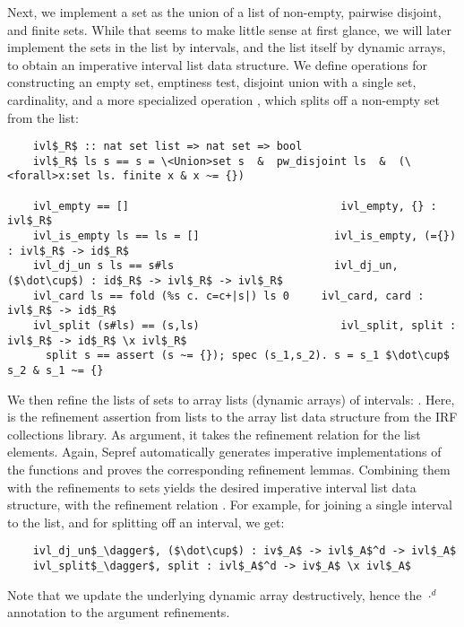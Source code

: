\documentclass[sn-mathphys,Numbered]{sn-jnl}
\theoremstyle{thmstyleone}%
\theoremstyle{definition}%
\theoremstyle{thmstylethree}%
\begin{document}
  Next, we implement a set as the union of a list of non-empty, pairwise disjoint, and finite sets.
  While that seems to make little sense at first glance, we will later implement the sets in the list by intervals,
  and the list itself by dynamic arrays, to obtain an imperative interval list data structure.
  We define operations for constructing an empty set, emptiness test,
  disjoint union with a single set, cardinality, and a more specialized operation , which splits off
  a non-empty set from the list:
  \begin{lstlisting}
    ivl$_R$ :: nat set list => nat set => bool
    ivl$_R$ ls s == s = \<Union>set s  &  pw_disjoint ls  &  (\<forall>x:set ls. finite x & x ~= {})

    ivl_empty == []                                 ivl_empty, {} : ivl$_R$
    ivl_is_empty ls == ls = []                     ivl_is_empty, (={}) : ivl$_R$ -> id$_R$
    ivl_dj_un s ls == s#ls                         ivl_dj_un, ($\dot\cup$) : id$_R$ -> ivl$_R$ -> ivl$_R$
    ivl_card ls == fold (%s c. c=c+|s|) ls 0     ivl_card, card : ivl$_R$ -> id$_R$
    ivl_split (s#ls) == (s,ls)                      ivl_split, split : ivl$_R$ -> id$_R$ \x ivl$_R$
      split s == assert (s ~= {}); spec (s_1,s_2). s = s_1 $\dot\cup$ s_2 & s_1 ~= {}
  \end{lstlisting}

  We then refine the lists of sets to array lists (dynamic arrays) of intervals: .
  Here,  is the refinement assertion from lists to the array list data structure from the IRF collections library.
  As argument, it takes the refinement relation for the list elements.
  Again, Sepref automatically generates imperative implementations of the  functions and proves the corresponding
  refinement lemmas. Combining them with the refinements to sets yields the desired imperative interval list data structure,
  with the refinement relation .
  For example, for joining a single interval to the list, and for splitting off an interval, we get:
  \begin{lstlisting}
    ivl_dj_un$_\dagger$, ($\dot\cup$) : iv$_A$ -> ivl$_A$^d -> ivl$_A$
    ivl_split$_\dagger$, split : ivl$_A$^d -> iv$_A$ \x ivl$_A$
  \end{lstlisting}
  Note that we update the underlying dynamic array destructively, hence the $\cdot^d$ annotation to the argument refinements.
\end{document}
